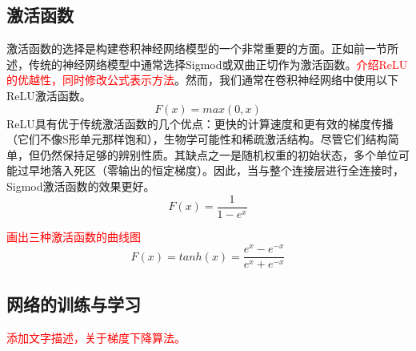 \subsection{激活函数}
激活函数的选择是构建卷积神经网络模型的一个非常重要的方面。正如前一节所述，传统的神经网络模型中通常选择Sigmod或双曲正切作为激活函数。\textcolor{red}{介绍ReLU的优越性，同时修改公式表示方法}。然而，我们通常在卷积神经网络中使用以下ReLU激活函数。
\begin{equation}
F(x) = max (0, x)
\end{equation}
ReLU具有优于传统激活函数的几个优点：更快的计算速度和更有效的梯度传播（它们不像S形单元那样饱和），生物学可能性和稀疏激活结构。尽管它们结构简单，但仍然保持足够的辨别性质。其缺点之一是随机权重的初始状态，多个单位可能过早地落入死区（零输出的恒定梯度）。因此，当与整个连接层进行全连接时，Sigmod激活函数的效果更好。
\begin{equation}
F(x) = \frac{1}{1-e^x}
\end{equation}

\textcolor{red}{画出三种激活函数的曲线图}
\begin{equation}
  F(x)=tanh(x)=\frac{e^x-e^{-x}}{e^x+e^{-x}}
\end{equation}
\subsection{网络的训练与学习}
\textcolor{red}{添加文字描述，关于梯度下降算法。}

